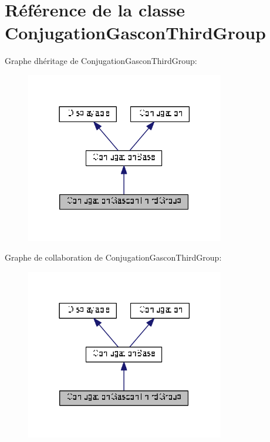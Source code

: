 \hypertarget{class_conjugation_gascon_third_group}{}\section{Référence de la classe Conjugation\+Gascon\+Third\+Group}
\label{class_conjugation_gascon_third_group}


Graphe d\textquotesingle{}héritage de Conjugation\+Gascon\+Third\+Group\+:
\nopagebreak
\begin{figure}[H]
\begin{center}
\leavevmode
\includegraphics[width=246pt]{class_conjugation_gascon_third_group__inherit__graph}
\end{center}
\end{figure}


Graphe de collaboration de Conjugation\+Gascon\+Third\+Group\+:
\nopagebreak
\begin{figure}[H]
\begin{center}
\leavevmode
\includegraphics[width=246pt]{class_conjugation_gascon_third_group__coll__graph}
\end{center}
\end{figure}
